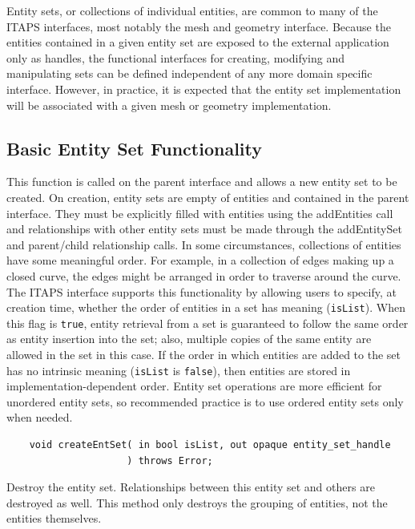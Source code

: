 \documentclass{article}
\begin{document}
Entity sets, or collections of individual entities, are common 
to many of the ITAPS interfaces, most notably the mesh and geometry 
interface. Because the entities contained in a given entity set 
are exposed to the external application only as handles, the 
functional interfaces for creating, modifying and manipulating 
sets can be defined independent of any more domain specific interface. 
However, in practice, it is expected that the entity set implementation 
will be associated with a given mesh or geometry implementation. 


\subsection{Basic Entity Set Functionality}

This function is called on the parent interface and allows a 
new entity set to be created. On creation, entity sets 
are empty of entities and contained in the parent interface. 
They must be explicitly filled with entities using the addEntities 
call and relationships with other entity sets must be made through 
the addEntitySet and parent/child relationship calls. In some 
circumstances, collections of entities have some meaningful order. 
For example, in a collection of edges making up a closed curve, 
the edges might be arranged in order to traverse around the curve. 
The ITAPS interface supports this functionality by allowing users 
to specify, at creation time, whether the order of entities in 
a set has meaning ({\tt isList}). When this flag is {\tt true}, entity 
retrieval from a set is guaranteed to follow the same order as 
entity insertion into the set; also, multiple copies of the same 
entity are allowed in the set in this case. If the order 
in which entities are added to the set has no intrinsic meaning 
({\tt isList} is {\tt false}), then entities are stored in implementation-dependent 
order. Entity set operations are more efficient for unordered 
entity sets, so recommended practice is to use ordered entity 
sets only when needed.

\begin{verbatim}
    void createEntSet( in bool isList, out opaque entity_set_handle
                     ) throws Error;

\end{verbatim}

Destroy the entity set. Relationships between this entity 
set and others are destroyed as well. This method only 
destroys the grouping of entities, not the entities themselves. 
\end{document}
